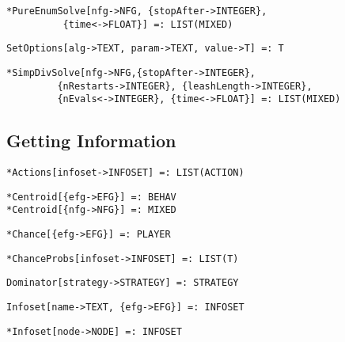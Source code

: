 \protect \large \begin{verbatim}
*PureEnumSolve[nfg->NFG, {stopAfter->INTEGER}, 
          {time<->FLOAT}] =: LIST(MIXED) 
\end{verbatim}\normalsize

\protect \large \begin{verbatim}
SetOptions[alg->TEXT, param->TEXT, value->T] =: T
\end{verbatim}\normalsize

\protect \large \begin{verbatim}
*SimpDivSolve[nfg->NFG,{stopAfter->INTEGER}, 
         {nRestarts->INTEGER}, {leashLength->INTEGER},
         {nEvals<->INTEGER}, {time<->FLOAT}] =: LIST(MIXED)
\end{verbatim}\normalsize

\medskip
\subsection{Getting Information}

\protect \large \begin{verbatim} 
*Actions[infoset->INFOSET] =: LIST(ACTION)
\end{verbatim}\normalsize

\protect \large \begin{verbatim} 
*Centroid[{efg->EFG}] =: BEHAV
*Centroid[{nfg->NFG}] =: MIXED
\end{verbatim}\normalsize

\protect \large \begin{verbatim}
*Chance[{efg->EFG}] =: PLAYER
\end{verbatim}\normalsize

\protect \large \begin{verbatim}
*ChanceProbs[infoset->INFOSET] =: LIST(T)
\end{verbatim}\normalsize

\protect \large \begin{verbatim}
Dominator[strategy->STRATEGY] =: STRATEGY
\end{verbatim}\normalsize

\protect \large \begin{verbatim} 
Infoset[name->TEXT, {efg->EFG}] =: INFOSET
\end{verbatim}\normalsize

\protect \large \begin{verbatim}
*Infoset[node->NODE] =: INFOSET
\end{verbatim}\normalsize


